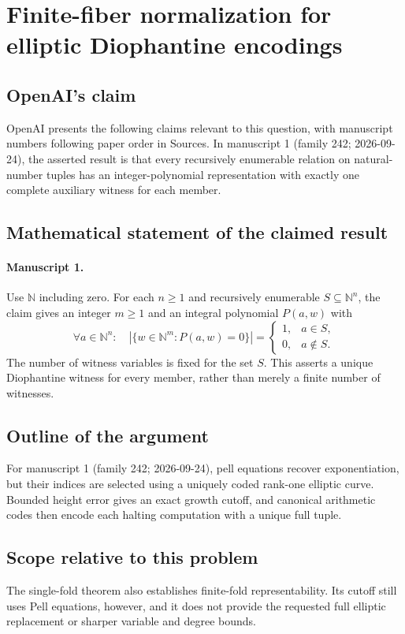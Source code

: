 \documentclass[11pt]{article}
\begin{document}
\section*{Finite-fiber normalization for elliptic Diophantine encodings}

\subsection{OpenAI's claim}
OpenAI presents the following claims relevant to this question, with manuscript numbers following paper order in Sources. In manuscript 1 (family 242; 2026-09-24), the asserted result is that every recursively enumerable relation on natural-number tuples has an integer-polynomial representation with exactly one complete auxiliary witness for each member.

\subsection{Mathematical statement of the claimed result}
\paragraph{Manuscript 1.}
Use $\mathbb N$ including zero. For each $n\ge1$ and recursively enumerable $S\subseteq\mathbb N^n$, the claim gives an integer $m\ge1$ and an integral polynomial $P(a,w)$ with
\[
 \forall a\in\mathbb N^n:\quad
 |\{w\in\mathbb N^m:P(a,w)=0\}|=
 \begin{cases}1,&a\in S,\\0,&a\notin S.\end{cases}
\]
The number of witness variables is fixed for the set $S$. This asserts a unique Diophantine witness for every member, rather than merely a finite number of witnesses.

\subsection{Outline of the argument}
For manuscript 1 (family 242; 2026-09-24), pell equations recover exponentiation, but their indices are selected using a uniquely coded rank-one elliptic curve. Bounded height error gives an exact growth cutoff, and canonical arithmetic codes then encode each halting computation with a unique full tuple.

\subsection{Scope relative to this problem}
The single-fold theorem also establishes finite-fold representability. Its cutoff still uses Pell equations, however, and it does not provide the requested full elliptic replacement or sharper variable and degree bounds.
\end{document}
